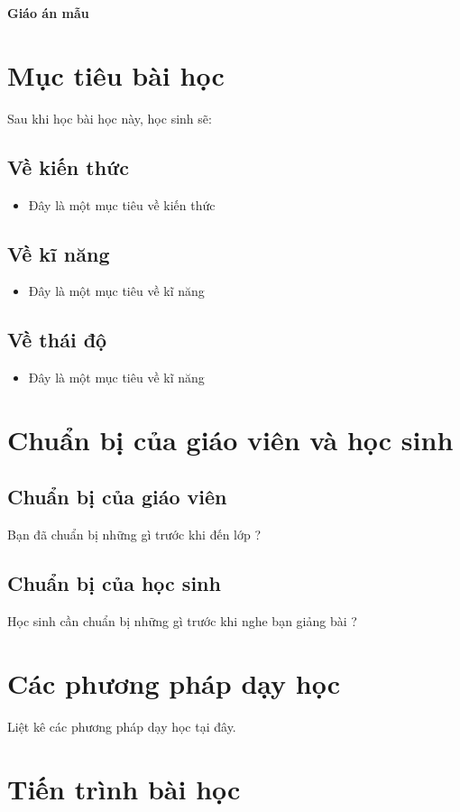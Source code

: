 \documentclass[12pt,a4paper]{article}
\author{Vũ Ngọc Binh}
\begin{document}
	\begin{center}
		\textbf{\huge Giáo án mẫu}
	\end{center}
	\section{Mục tiêu bài học}
	Sau khi học bài học này, học sinh sẽ:
	\subsection{Về kiến thức}
	\begin{itemize}
		\item Đây là một mục tiêu về kiến thức
	\end{itemize}
	\subsection{Về kĩ năng}
	\begin{itemize}
		\item Đây là một mục tiêu về kĩ năng
	\end{itemize}
	\subsection{Về thái độ}
	\begin{itemize}
		\item Đây là một mục tiêu về kĩ năng
	\end{itemize}
	\section{Chuẩn bị của giáo viên và học sinh}
	\subsection{Chuẩn bị của giáo viên}
	Bạn đã chuẩn bị những gì trước khi đến lớp ?
	\subsection{Chuẩn bị của học sinh}
	Học sinh cần chuẩn bị những gì trước khi nghe bạn giảng bài ?
	\section{Các phương pháp dạy học}
	Liệt kê các phương pháp dạy học tại đây.
	\section{Tiến trình bài học}
\end{document}

